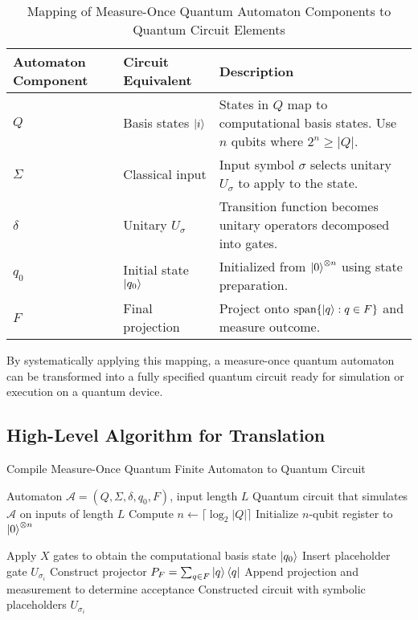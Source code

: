 \begin{table}[h]
    \centering
    \begin{tabularx}{\textwidth}{|l|l|X|}
    \hline
    \textbf{Automaton Component} & \textbf{Circuit Equivalent} & \textbf{Description} \\
    \hline
    $Q$ & Basis states $\ket{i}$ & States in $Q$ map to computational basis states. Use $n$ qubits where $2^n \geq |Q|$. \\
    \hline
    $\Sigma$ & Classical input & Input symbol $\sigma$ selects unitary $U_\sigma$ to apply to the state. \\
    \hline
    $\delta$ & Unitary $U_\sigma$ & Transition function becomes unitary operators decomposed into gates. \\
    \hline
    $q_0$ & Initial state $\ket{q_0}$ & Initialized from $\ket{0}^{\otimes n}$ using state preparation. \\
    \hline
    $F$ & Final projection & Project onto $\text{span}\{\ket{q} : q \in F\}$ and measure outcome. \\
    \hline
    \end{tabularx}
    \label{tab:automaton-to-circuit}
    \caption{Mapping of Measure-Once Quantum Automaton Components to Quantum Circuit Elements}
\end{table}

By systematically applying this mapping, a measure-once quantum automaton can be transformed into a fully specified quantum circuit ready for simulation or execution on a quantum device.

\subsection{High-Level Algorithm for Translation}
\begin{algorithm}[H]
    \caption{Compile Measure-Once Quantum Finite Automaton to Quantum Circuit}
    \label{alg:compile-mo-qfa}
    \begin{algorithmic}[1]
    \Require Automaton $\mathcal{A} = (Q, \Sigma, \delta, q_0, F)$, input length $L$
    \Ensure Quantum circuit that simulates $\mathcal{A}$ on inputs of length $L$
    \State Compute $n \gets \lceil \log_2 |Q| \rceil$
    \State Initialize $n$-qubit register to $\ket{0}^{\otimes n}$
    
    \State Apply $X$ gates to obtain the computational basis state $\ket{q_0}$
        \State Insert placeholder gate $U_{\sigma_i}$
    \EndFor
    \State Construct projector $P_F = \sum_{q \in F} \ket{q}\bra{q}$
    \State Append projection and measurement to determine acceptance
    \State \Return Constructed circuit with symbolic placeholders $U_{\sigma_i}$
    \end{algorithmic}
\end{algorithm}

